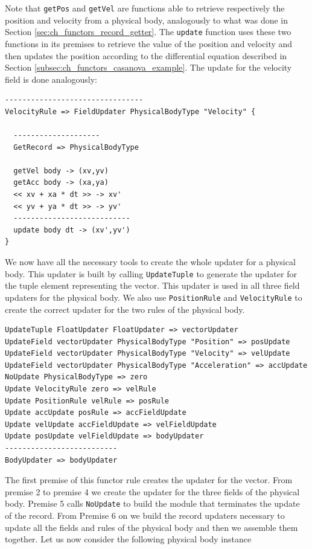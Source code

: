 \noindent
Note that \texttt{getPos} and \texttt{getVel} are functions able to retrieve respectively the position and velocity from a physical body, analogously to what was done in Section \ref{sec:ch_functors_record_getter}. The \texttt{update} function uses these two functions in its premises to retrieve the value of the position and velocity and then updates the position according to the differential equation described in Section \ref{subsec:ch_functors_casanova_example}. The update for the velocity field is done analogously:

\begin{lstlisting}
--------------------------------
VelocityRule => FieldUpdater PhysicalBodyType "Velocity" {

  --------------------
  GetRecord => PhysicalBodyType

  getVel body -> (xv,yv)
  getAcc body -> (xa,ya)
  << xv + xa * dt >> -> xv'
  << yv + ya * dt >> -> yv'
  ---------------------------
  update body dt -> (xv',yv')
}
\end{lstlisting}

\noindent
We now have all the necessary tools to create the whole updater for a physical body. This updater is built by calling \texttt{UpdateTuple} to generate the updater for the tuple element representing the vector. This updater is used in all three field updaters for the physical body. We also use \texttt{PositionRule} and \texttt{VelocityRule} to create the correct updater for the two rules of the physical body.

\begin{lstlisting}
UpdateTuple FloatUpdater FloatUpdater => vectorUpdater
UpdateField vectorUpdater PhysicalBodyType "Position" => posUpdate  
UpdateField vectorUpdater PhysicalBodyType "Velocity" => velUpdate  
UpdateField vectorUpdater PhysicalBodyType "Acceleration" => accUpdate
NoUpdate PhysicalBodyType => zero
Update VelocityRule zero => velRule
Update PositionRule velRule => posRule
Update accUpdate posRule => accFieldUpdate
Update velUpdate accFieldUpdate => velFieldUpdate
Update posUpdate velFieldUpdate => bodyUpdater
--------------------------
BodyUpdater => bodyUpdater
\end{lstlisting}

\noindent
The first premise of this functor rule creates the updater for the vector. From premise 2 to premise 4 we create the updater for the three fields of the physical body. Premise 5 calls \texttt{NoUpdate} to build the module that terminates the update of the record. From Premise 6 on we build the record updaters necessary to update all the fields and rules of the physical body and then we assemble them together.
Let us now consider the following physical body instance

